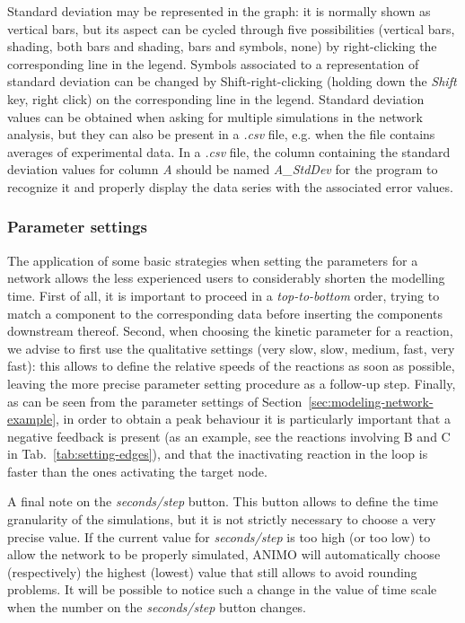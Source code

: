 Standard deviation may be represented in the graph: it is normally shown as vertical bars, but its aspect can be
cycled through five possibilities (vertical bars, shading, both bars and shading, bars and symbols, none) by right-clicking the
corresponding line in the legend. Symbols associated to a representation of standard deviation can be changed by Shift-right-clicking
(holding down the \emph{Shift} key, right click) on the corresponding line in the legend.
Standard deviation values can be obtained when asking for multiple simulations in the network
analysis, but they can also be present in a \emph{.csv} file, e.g. when the file contains averages of experimental data.
In a \emph{.csv} file, the column containing the standard deviation values for column \emph{A}
should be named \emph{A\_{}StdDev} for the program to recognize it and properly display the data series
with the associated error values.



\subsubsection{Parameter settings}
The application of some basic strategies when setting the parameters for a network allows
the less experienced users to considerably shorten the modelling time.
First of all, it is important to proceed in a \emph{top-to-bottom} order, trying to match
a component to the corresponding data before inserting the components downstream thereof.
Second, when choosing the kinetic parameter for a reaction, we advise to first use the qualitative settings (very slow, slow, medium, fast, very fast):
this allows to define the relative speeds of the reactions as soon as possible,
leaving the more precise parameter setting procedure as a follow-up step. Finally, as can be seen from
the parameter settings of Section~\ref{sec:modeling-network-example}, in order to obtain a peak
behaviour it is particularly important that
a negative feedback is present (as an example, see the reactions involving B and C in Tab.~\ref{tab:setting-edges}),
and that the inactivating reaction in the loop is faster than the ones activating the target node.

A final note on the \emph{seconds/step} button. This button allows to define the time granularity
of the simulations, but it is not strictly necessary to choose a very precise value.
If the current value for \emph{seconds/step}
is too high (or too low) to allow the network to be properly simulated, ANIMO will automatically choose (respectively)
the highest (lowest) value that still allows to avoid rounding problems. It will be possible to notice
such a change in the value of time scale when the number on the \emph{seconds/step} button changes.


